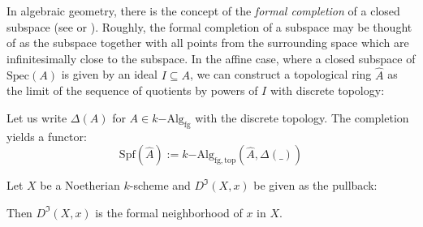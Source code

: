 \documentclass[9pt,twosided]{amsart}
\newcommand{\Spec}{\ensuremath{\mathrm{Spec}}}
\newcommand{\Spf}{\ensuremath{\mathrm{Spf}}}
\newcommand{\fgkAlg}{\ensuremath{k\mathrm{-Alg}_{\mathrm{fg}}}}
\newcommand{\fgkAlgTop}{\ensuremath{k\mathrm{-Alg}_{\mathrm{fg,top}}}}
\begin{document}
In algebraic geometry, there is the concept of the \emph{formal completion} of a closed subspace (see \cite[p.194]{hartshorne} or \cite[10.8]{ega}).
Roughly, the formal completion of a subspace may be thought of as the subspace together with
all points from the surrounding space which are infinitesimally close to the subspace.
In the affine case, where a closed subspace of $\Spec(A)$ is given by an ideal $I\subseteq A$, we can construct a topological ring $\hat{A}$
as the limit of the sequence of quotients by powers of $I$ with discrete topology:
\begin{center}
\end{center}
Let us write $\Delta(A)$ for $A\in\fgkAlg$ with the discrete topology.
The completion yields a functor:
\[ \Spf(\hat{A}) := \fgkAlgTop(\hat{A},\Delta(\_))\]
\begin{rmk}
  Let $X$ be a Noetherian $k$-scheme and $D^\Im(X,x)$ be given as the pullback:
  \begin{center}
  \end{center}
  Then $D^\Im(X,x)$ is the formal neighborhood of $x$ in $X$. 
\end{rmk}
\end{document}

